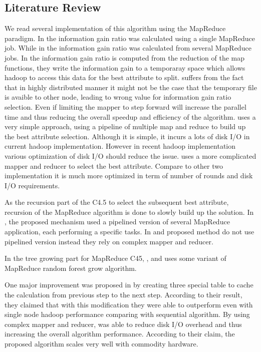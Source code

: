 \documentclass{article}
\begin{document}
\subsection{Literature Review}
We read several implementation of this algorithm using the MapReduce paradigm.
In \cite{c452017} the information gain ratio was calculated using a single MapReduce job.
While in \cite{c45cn} the information gain ratio was calculated from several MapReduce jobs.
In \cite {c45in} the information gain ratio is computed from the reduction of the map functions,
they write the information gain to a temporaray space which allows hadoop to access this data for the best attribute to split.
\cite{c45in} suffers from the fact that in highly distributed manner it might not be the case that the temporary file is avaible to other node,
 leading to wrong value for information gain ratio selection.
 Even if limiting the mapper to step forward will increase the parallel time and thus reducing the overall speedup and efficiency of the algorithm.
 \cite{c45cn} uses a very simple approach, using a pipeline of multiple map and reduce to build up the best attribute selection.
 Although it is simple, it incurs a lots of disk I/O in current hadoop implementation.
 However in recent hadoop implementation various optimization of disk I/O should reduce the issue.
 \cite{c452017} uses a more complicated mapper and reducer to select the best attribute.
  Compare to other two implementation it is much more optimized in term of number of rounds and disk I/O requirements.

\BlankLine
As the recursion part of the C4.5 to select the subsequent best attribute, recursion of the MapReduce algorithm is done to slowly build up the solution. In \cite{c45cn}, the proposed mechanism used a pipelined version of several MapReduce application, each performing a specific tasks. In \cite{c452017} and \cite{c45in} proposed method do not use pipelined version instead they rely on complex mapper and reducer.

\BlankLine
In the tree growing part for MapReduce C45, \cite{c452017}, \cite{c45cn} and \cite{c45in} uses some variant of MapReduce random forest grow algorithm.

\BlankLine
One major improvement was proposed in \cite{c45cn} by creating three special table to cache the calculation from previous step to the next step. According to their result, they claimed that with this modification they were able to outperform even with single node hadoop performance comparing with sequential algorithm. By using complex mapper and reducer, \cite{c452017} was able to reduce disk I/O overhead and thus increasing the overall algorithm performance. According to their claim, the proposed algorithm scales very well with commodity hardware.
\end{document}
